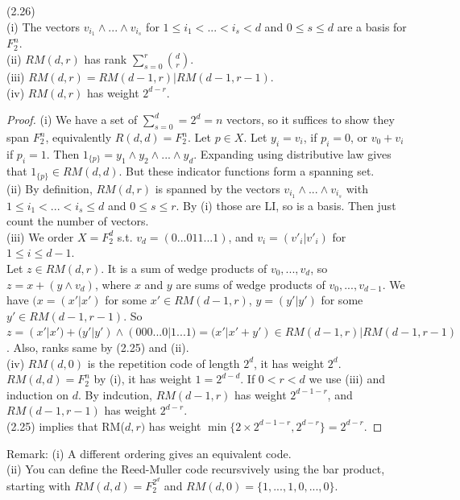 \documentclass[a4paper]{article}
\begin{document}
\begin{thm} (2.26)\\
(i) The vectors $v_{i_1} \wedge ... \wedge v_{i_s}$ for $1 \leq i_1 < ... < i_s < d$ and $0 \leq s \leq d$ are a basis for $F_2^n$.\\
(ii) $RM(d,r)$ has rank $\sum_{s=0}^r {d \choose r}$.\\
(iii) $RM(d,r) = RM(d-1,r) | RM(d-1,r-1)$.\\
(iv) $RM(d,r)$ has weight $2^{d-r}$.
\begin{proof}
(i) We have a set of $\sum_{s=0}^d = 2^d = n$ vectors, so it suffices to show they span $F_2^n$, equivalently $R(d,d) = F_2^n$. Let $p \in X$. Let $y_i = v_i$, if $p_i=0$, or $v_0+v_i$ if $p_i = 1$. Then $1_{\{p\}} = y_1 \wedge y_2 \wedge ... \wedge y_d$. Expanding using distributive law gives that $1_{\{p\}} \in RM(d,d)$. But these indicator functions form a spanning set.\\
(ii) By definition, $RM(d,r)$ is spanned by the vectors $v_{i_1} \wedge ... \wedge v_{i_s}$ with $1 \leq i_1 < ... < i_s \leq d$ and $0 \leq s \leq r$. By (i) those are LI, so is a basis. Then just count the number of vectors.\\
(iii) We order $X = F_2^d$ s.t. $v_d = (0...0 11...1)$, and $v_i = (v'_i | v'_i)$ for $1 \leq i \leq d-1$.\\
Let $z \in RM(d,r)$. It is a sum of wedge products of $v_0,...,v_d$, so $z = x+(y \wedge v_d)$, where $x$ and $y$ are sums of wedge products of $v_0,...,v_{d-1}$. We have $(x=(x'|x')$ for some $x' \in RM(d-1,r)$, $y= (y' | y')$ for some $y' \in RM(d-1,r-1)$. So $z=(x'|x')+(y'|y') \wedge (000...0|1...1) = (x'|x'+y') \in RM(d-1,r) | RM(d-1,r-1)$. Also, ranks same by (2.25) and (ii).\\
(iv) $RM(d,0)$ is the repetition code of length $2^d$, it has weight $2^d$. $RM(d,d) = F_2^n$ by (i), it has weight $1=2^{d-d}$. If $0 < r < d$ we use (iii) and induction on $d$. By indcution, $RM(d-1,r)$ has weight $2^{d-1-r}$, and $RM(d-1,r-1)$ has weight $2^{d-r}$.\\
(2.25) implies that RM($d,r)$ has weight $\min \{2 \times 2^{d-1-r}, 2^{d-r}\} = 2^{d-r}$.
\end{proof}
\end{thm}

Remark: (i) A different ordering gives an equivalent code.\\
(ii) You can define the Reed-Muller code recursvively using the bar product, starting with $RM(d,d) = F_2^{2^d}$ and $RM(d,0) = \{1,...,1,0,...,0\}$.
\end{document}
